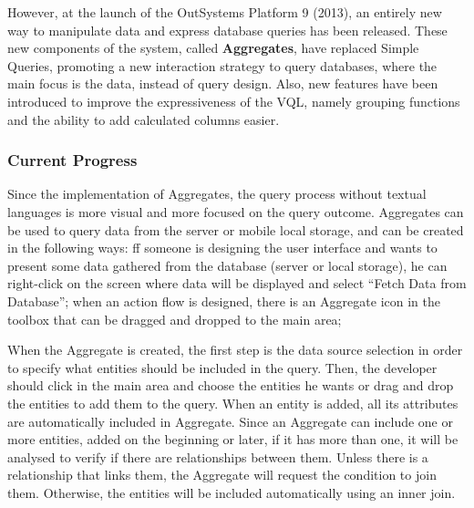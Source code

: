However, at the launch of the OutSystems Platform 9 (2013), an entirely new way to manipulate data and express database queries has been released. These new components of the system, called \textbf{Aggregates}, have replaced Simple Queries, promoting a new interaction strategy to query databases, where the main focus is the data, instead of query design. Also, new features have been introduced to improve the expressiveness of the \gls{VQL}, namely grouping functions and the ability to add calculated columns easier.


\subsubsection{Current Progress}
\label{subsubsec:current_progress}

Since the implementation of Aggregates, the query process without textual languages is more visual and more focused on the query outcome. Aggregates can be used to query data from the server or mobile local storage, and can be created in the following ways: ff someone is designing the user interface and wants to present some data gathered from the database (server or local storage), he can right-click on the screen where data will be displayed and select “Fetch Data from Database”; when an action flow is designed, there is an Aggregate icon in the toolbox that can be dragged and dropped to the main area;


When the Aggregate is created, the first step is the data source selection in order to specify what entities should be included in the query. Then, the developer should click in the main area and choose the entities he wants or drag and drop the entities to add them to the query. When an entity is added, all its attributes are automatically included in Aggregate. Since an Aggregate can include one or more entities, added on the beginning or later, if it has more than one, it will be analysed to verify if there are relationships between them. Unless there is a relationship that links them, the Aggregate will request the condition to join them. Otherwise, the entities will be included automatically using an inner join.


